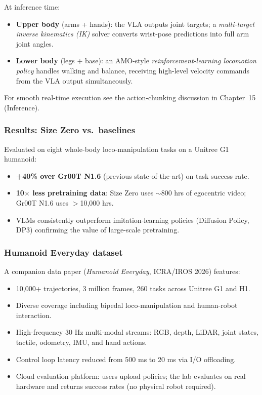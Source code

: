 At inference time:
\begin{itemize}
  \item \textbf{Upper body} (arms + hands): the VLA outputs joint targets; a \emph{multi-target inverse kinematics (IK)} solver converts wrist-pose predictions into full arm joint angles.
  \item \textbf{Lower body} (legs + base): an AMO-style \emph{reinforcement-learning locomotion policy} handles walking and balance, receiving high-level velocity commands from the VLA output simultaneously.
\end{itemize}

For smooth real-time execution see the action-chunking discussion in Chapter~15 (Inference).

\subsubsection{Results: Size Zero vs.\ baselines}

Evaluated on eight whole-body loco-manipulation tasks on a Unitree G1 humanoid:
\begin{itemize}
  \item \textbf{+40\% over Gr00T N1.6} (previous state-of-the-art) on task success rate.
  \item \textbf{10$\times$ less pretraining data}: Size Zero uses $\sim$800 hrs of egocentric video; Gr00T N1.6 uses $>$10{,}000 hrs.
  \item VLMs consistently outperform imitation-learning policies (Diffusion Policy, DP3) confirming the value of large-scale pretraining.
\end{itemize}

\subsubsection{Humanoid Everyday dataset}

A companion data paper (\textit{Humanoid Everyday}, ICRA/IROS 2026) features:
\begin{itemize}
  \item 10{,}000+ trajectories, 3 million frames, 260 tasks across Unitree G1 and H1.
  \item Diverse coverage including bipedal loco-manipulation and human-robot interaction.
  \item High-frequency 30 Hz multi-modal streams: RGB, depth, LiDAR, joint states, tactile, odometry, IMU, and hand actions.
  \item Control loop latency reduced from 500 ms to 20 ms via I/O offloading.
  \item Cloud evaluation platform: users upload policies; the lab evaluates on real hardware and returns success rates (no physical robot required).
\end{itemize}


